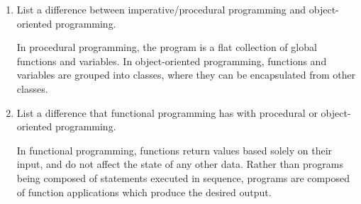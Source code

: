 \begin{enumerate}

\item List a difference between imperative/procedural programming and object-oriented programming.

\begin{answer}
In procedural programming, the program is a flat collection of global functions and variables. In object-oriented programming, functions and variables are grouped into classes, where they can be encapsulated from other classes.
\end{answer}


\item List a difference that functional programming has with procedural or object-oriented programming.

\begin{answer}
In functional programming, functions return values based solely on their input, and do not affect the state of any other data. Rather than programs being composed of statements executed in sequence, programs are composed of function applications which produce the desired output.
\end{answer}

\end{enumerate}